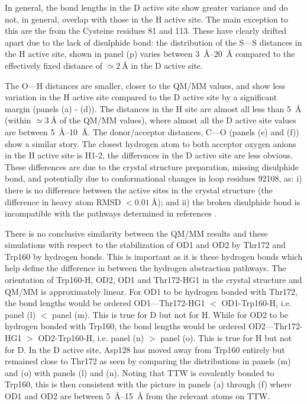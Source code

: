 In general, the bond lengths in the D active site show greater variance and do not, in general, overlap with those in the H active site. The main exception to this are the from the Cysteine residues 81 and 113. These have clearly drifted apart due to the lack of disulphide bond: the distribution of the S---S distances in the H active site, shown in panel (p) varies between \SIrange{3}{20}{\angstrom} compared to the effectively fixed distance of $\simeq \SI{2}{\angstrom}$ in the D active site. 

The O---H distances are smaller, closer to the QM/MM values, and show less variation in the H active site compared to the D active site by a significant margin (panels (a) - (d)). The distances in the H site are almost all less than \SI{5}{\angstrom} (within $\simeq\SI{3}{\angstrom}$ of the QM/MM values), where almost all the D active site values are between \SIrange{5}{10}{\angstrom}. The donor/acceptor distances, C---O (panels (e) and (f)) show a similar story. The closest hydrogen atom to both acceptor oxygen anions in the H active site is H1-2, the differences in the D active site are less obvious. These differences are due to the crystal structure preparation,  missing disulphide bond, and potentially due to conformational changes in loop residues \num{92}{108}, as: i) there is no difference between the active sites in the crystal structure (the difference in heavy atom RMSD  $<\SI{0.01}{\angstrom}$); and ii) the broken disulphide bond is incompatible with the pathways determined in references \cite{masgrauTunnelingClassicalPaths2007, ranaghanInitioQMMM2017}. 

There is no conclusive similarity between the QM/MM results and these simulations with respect to the stabilization of OD1 and OD2 by Thr172 and Trp160 by hydrogen bonds. This is important as it is these hydrogen bonds which help define the difference in between the hydrogen abstraction pathways. The orientation of Trp160-H, OD2, OD1 and Thr172-HG1 in the crystal structure and QM/MM is approximately linear. For OD1 to be hydrogen bonded with Thr172, the bond lengths would be ordered OD1---Thr172-HG1 $<$ OD1-Trp160-H, i.e. panel (l) $<$ panel (m). This is true for D but not for H. While for OD2 to be hydrogen bonded with Trp160, the bond lengths would be ordered OD2---Thr172-HG1 $>$ OD2-Trp160-H, i.e. panel (n) $>$ panel (o). This is true for H but not for D. In the D active site, Asp128 has moved away from Trp160 entirely but remained close to Thr172 as seen by comparing the distributions in  panels (m) and (o)  with panels (l) and (n). Noting that TTW is covalently bonded to Trp160, this is then consistent with the picture in panels (a) through (f) where OD1 and OD2 are between \SIrange{5}{15}{\angstrom} from the relevant atoms on TTW.  

